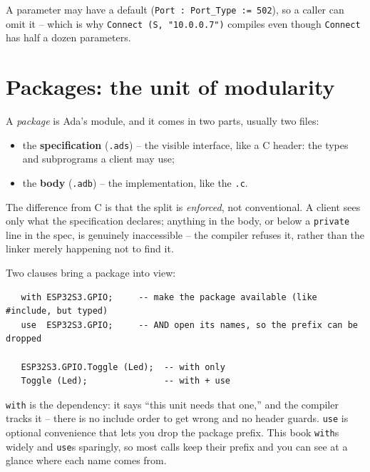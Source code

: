A parameter may have a default (\texttt{Port : Port\_Type := 502}), so a caller can
omit it -- which is why \texttt{Connect (S, "10.0.0.7")} compiles even though
\texttt{Connect} has half a dozen parameters.


\section{Packages: the unit of modularity}

A \emph{package} is Ada's module, and it comes in two parts, usually two files:

\begin{itemize}
  \item the \textbf{specification} (\texttt{.ads}) -- the visible interface, like a
        C header: the types and subprograms a client may use;
  \item the \textbf{body} (\texttt{.adb}) -- the implementation, like the \texttt{.c}.
\end{itemize}

The difference from C is that the split is \emph{enforced}, not conventional. A
client sees only what the specification declares; anything in the body, or below a
\texttt{private} line in the spec, is genuinely inaccessible -- the compiler refuses
it, rather than the linker merely happening not to find it.

Two clauses bring a package into view:

\begin{lstlisting}
   with ESP32S3.GPIO;     -- make the package available (like #include, but typed)
   use  ESP32S3.GPIO;     -- AND open its names, so the prefix can be dropped

   ESP32S3.GPIO.Toggle (Led);  -- with only
   Toggle (Led);               -- with + use
\end{lstlisting}

\texttt{with} is the dependency: it says ``this unit needs that one,'' and the
compiler tracks it -- there is no include order to get wrong and no header guards.
\texttt{use} is optional convenience that lets you drop the package prefix. This
book \texttt{with}s widely and \texttt{use}s sparingly, so most calls keep their
prefix and you can see at a glance where each name comes from.

